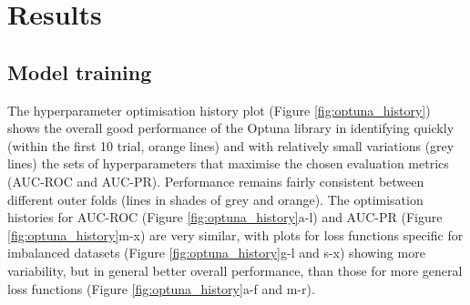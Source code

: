 \section{Results}
\label{data_driven_flash_floods_short_medium_range_results}

\subsection{Model training}

The  hyperparameter optimisation history plot (Figure \ref{fig:optuna_history}) shows the overall good performance of the Optuna library in identifying quickly (within the first 10 trial, orange lines) and with relatively small variations (grey lines) the sets of hyperparameters that maximise the chosen evaluation metrics (AUC-ROC and AUC-PR). Performance remains fairly consistent between different outer folds (lines in shades of grey and orange). The optimisation histories for AUC-ROC (Figure \ref{fig:optuna_history}a-l) and AUC-PR (Figure \ref{fig:optuna_history}m-x) are very similar, with plots for loss functions specific for imbalanced datasets (Figure \ref{fig:optuna_history}g-l and s-x) showing more variability, but in general better overall performance, than those for more general loss functions (Figure \ref{fig:optuna_history}a-f and m-r). 

